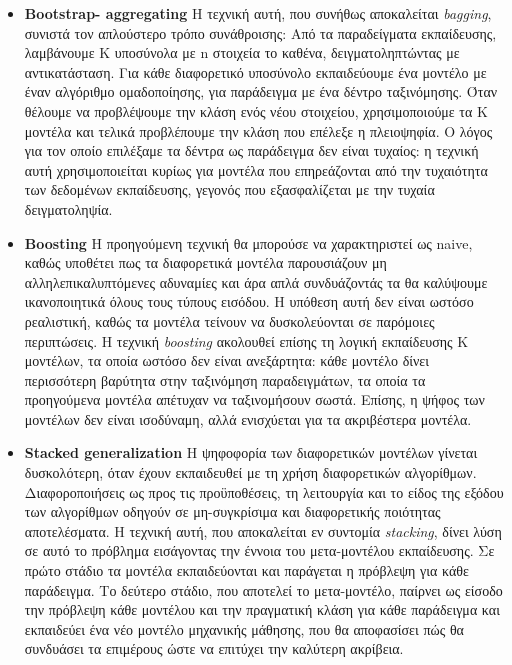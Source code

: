 \begin{itemize}
	\item \textbf{Bootstrap- aggregating} Η τεχνική αυτή, που συνήθως αποκαλείται \textit{bagging}, συνιστά τον απλούστερο τρόπο συνάθροισης: Από τα παραδείγματα εκπαίδευσης, λαμβάνουμε Κ υποσύνολα με n στοιχεία το καθένα, δειγματοληπτώντας με αντικατάσταση. Για κάθε διαφορετικό υποσύνολο εκπαιδεύουμε ένα μοντέλο με έναν αλγόριθμο ομαδοποίησης, για παράδειγμα με ένα δέντρο ταξινόμησης. Όταν θέλουμε να προβλέψουμε την κλάση ενός νέου στοιχείου, χρησιμοποιούμε τα Κ μοντέλα και τελικά προβλέπουμε την κλάση που επέλεξε η πλειοψηφία. Ο λόγος για τον οποίο επιλέξαμε τα δέντρα ως παράδειγμα δεν είναι τυχαίος: η τεχνική αυτή χρησιμοποιείται κυρίως για μοντέλα που επηρεάζονται από την τυχαιότητα των δεδομένων εκπαίδευσης, γεγονός που εξασφαλίζεται με την τυχαία δειγματοληψία.
	\item \textbf{Boosting} Η προηγούμενη τεχνική θα μπορούσε να χαρακτηριστεί ως naive, καθώς υποθέτει πως τα διαφορετικά μοντέλα παρουσιάζουν μη αλληλεπικαλυπτόμενες αδυναμίες και άρα απλά συνδυάζοντάς τα θα καλύψουμε ικανοποιητικά όλους τους τύπους εισόδου. Η υπόθεση αυτή δεν είναι ωστόσο ρεαλιστική, καθώς τα μοντέλα τείνουν να δυσκολεύονται σε παρόμοιες περιπτώσεις. Η τεχνική \textit{boosting} ακολουθεί επίσης τη λογική εκπαίδευσης Κ μοντέλων, τα οποία ωστόσο δεν είναι ανεξάρτητα: κάθε μοντέλο δίνει περισσότερη βαρύτητα στην ταξινόμηση παραδειγμάτων, τα οποία τα προηγούμενα μοντέλα απέτυχαν να ταξινομήσουν σωστά. Επίσης, η ψήφος των μοντέλων δεν είναι ισοδύναμη, αλλά ενισχύεται για τα ακριβέστερα μοντέλα.
	\item \textbf{Stacked generalization} Η ψηφοφορία των διαφορετικών μοντέλων γίνεται δυσκολότερη, όταν έχουν εκπαιδευθεί με τη χρήση διαφορετικών αλγορίθμων. Διαφοροποιήσεις ως προς τις προϋποθέσεις, τη λειτουργία και το είδος της εξόδου των αλγορίθμων οδηγούν σε μη-συγκρίσιμα  και διαφορετικής ποιότητας αποτελέσματα. Η τεχνική αυτή, που αποκαλείται εν συντομία \textit{stacking}, δίνει λύση σε αυτό το πρόβλημα εισάγοντας την έννοια του μετα-μοντέλου εκπαίδευσης. Σε πρώτο στάδιο τα μοντέλα εκπαιδεύονται και παράγεται η πρόβλεψη για κάθε παράδειγμα. Το δεύτερο στάδιο, που αποτελεί το μετα-μοντέλο, παίρνει ως είσοδο την πρόβλεψη κάθε μοντέλου και την πραγματική
	κλάση για κάθε παράδειγμα και εκπαιδεύει ένα νέο μοντέλο μηχανικής μάθησης, που θα αποφασίσει πώς θα συνδυάσει τα επιμέρους ώστε να επιτύχει την καλύτερη ακρίβεια.
\end{itemize}

